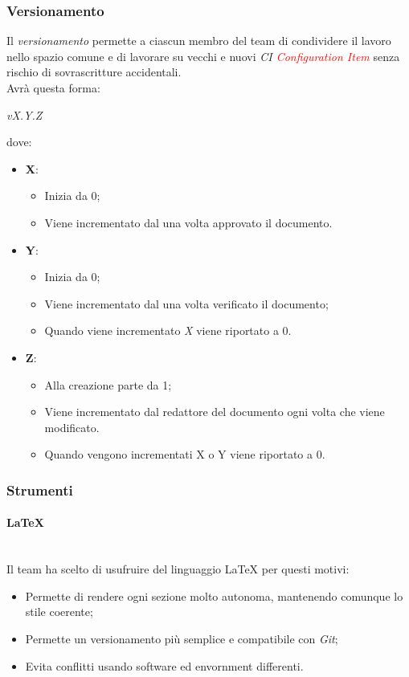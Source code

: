 	\subsubsection{Versionamento}
	Il \emph{versionamento} permette a ciascun membro del team di condividere il lavoro nello spazio comune e di lavorare su vecchi e nuovi \emph{CI \textcolor{red}{Configuration Item}} senza rischio di sovrascritture accidentali.
	\\Avrà questa forma:
	\begin{center}
		\emph{vX.Y.Z}
	\end{center}
	dove:
	\begin{itemize}
		\item \textbf{X}:
		\begin{itemize}
			\item Inizia da 0;
			\item Viene incrementato dal \RdP{} una volta approvato il documento.
		\end{itemize}
		\item \textbf{Y}:
		\begin{itemize}
			\item Inizia da 0;
			\item Viene incrementato dal \ver{} una volta verificato il documento;
			\item Quando viene incrementato \emph{X} viene riportato a 0.
		\end{itemize}
		\item \textbf{Z}:
		\begin{itemize}
			\item Alla creazione parte da 1;
			\item Viene incrementato dal redattore del documento ogni volta che viene modificato.
			\item Quando vengono incrementati X o Y viene riportato a 0.
		\end{itemize}
	\end{itemize}
	\subsubsection{Strumenti}
			\paragraph{\textbf{\LaTeX}}
			~\\Il team ha scelto di usufruire del linguaggio \LaTeX{} per questi motivi:
			\begin{itemize}
				\item Permette di rendere ogni sezione molto autonoma, mantenendo comunque lo stile coerente;
				\item Permette un versionamento più semplice e compatibile con \emph{Git};
				\item Evita conflitti usando software ed envornment differenti.
			\end{itemize}

